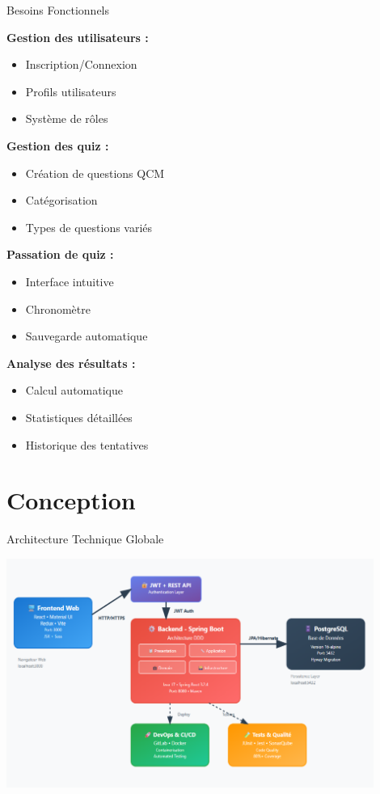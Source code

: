 \documentclass[aspectratio=169]{beamer}
\begin{document}
\begin{frame}{Besoins Fonctionnels}
    \begin{multicols}{2}
        \textbf{Gestion des utilisateurs :}
        \begin{itemize}
            \item Inscription/Connexion
            \item Profils utilisateurs
            \item Système de rôles
        \end{itemize}

        \textbf{Gestion des quiz :}
        \begin{itemize}
            \item Création de questions QCM
            \item Catégorisation
            \item Types de questions variés
        \end{itemize}

        \textbf{Passation de quiz :}
        \begin{itemize}
            \item Interface intuitive
            \item Chronomètre
            \item Sauvegarde automatique
        \end{itemize}

        \textbf{Analyse des résultats :}
        \begin{itemize}
            \item Calcul automatique
            \item Statistiques détaillées
            \item Historique des tentatives
        \end{itemize}
    \end{multicols}
\end{frame}

\section{Conception}

\begin{frame}{Architecture Technique Globale}
    \begin{center}
        \includegraphics[width=0.9\textwidth]{latex_media/media/Architecture_globale.png}
    \end{center}
\end{frame}
\end{document}

